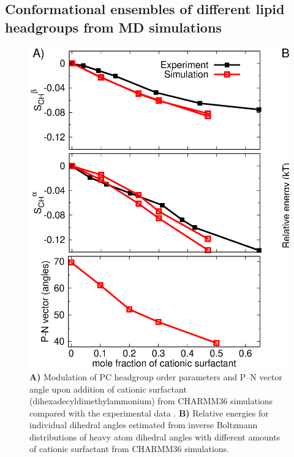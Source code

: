 \documentclass[aps,prl,superscriptaddress,twocolumn]{revtex4}
\begin{document}
\subsection{Conformational ensembles of different lipid headgroups from MD simulations}

\begin{figure}[bt]
  \centering
  \includegraphics[width=18.0cm]{./Figs/HGorderparametersPCvsSURFchangeDIHEDRALSlog.eps}
  \caption{\label{changesWITHsurf}
    \textbf{A)} Modulation of PC headgroup order parameters and P--N vector angle upon addition of cationic surfactant (dihexadecyldimethylammonium)
    from CHARMM36 simulations compared with the experimental data \cite{scherer89}.
    \textbf{B)} Relative energies for individual dihedral angles estimated from inverse Boltzmann distributions of heavy atom dihedral angles
    with different amounts of cationic surfactant from CHARMM36 simulations.
  }
\end{figure}
\end{document}
